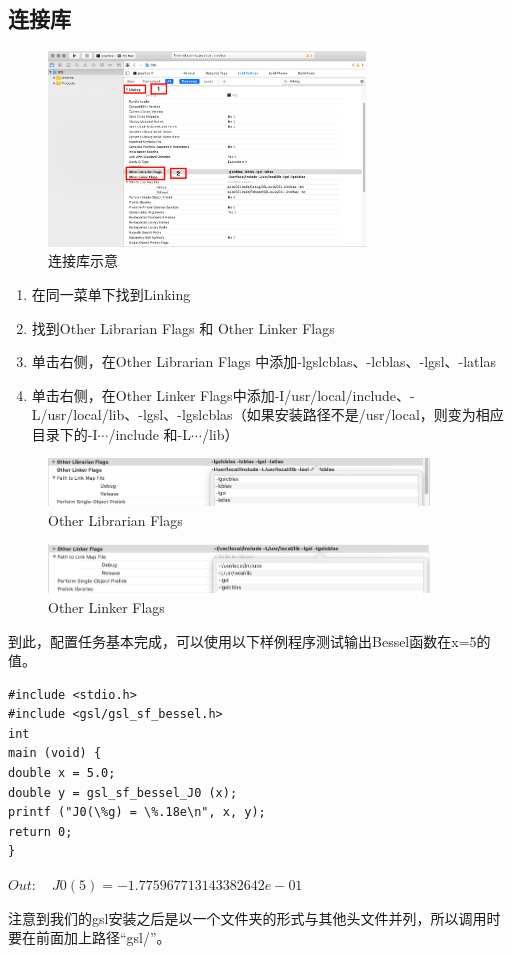 \documentclass[a4paper,11pt,onecolumn,twoside]{article}
\begin{document}
\subsection{连接库}
\begin{figure}[htbp]
  \centering
  \includegraphics[width=0.75\textwidth]{figures/2.png}
  \caption{连接库示意} \label{pngsample}
\end{figure}
\begin{enumerate}
\item 在同一菜单下找到Linking
\item 找到Other Librarian Flags 和 Other Linker Flags
\item 单击右侧，在Other Librarian Flags 中添加-lgslcblas、-lcblas、-lgsl、-latlas
\item 单击右侧，在Other Linker Flags中添加-I/usr/local/include、-L/usr/local/lib、-lgsl、-lgslcblas（如果安装路径不是/usr/local，则变为相应目录下的-I$\cdots$/include 和-L$\cdots$/lib）
\end{enumerate}
\begin{figure}[htbp]
  \centering
  \includegraphics[width=0.9\textwidth]{figures/3.png}
  \caption{Other Librarian Flags} \label{pngsample}
\end{figure}
\begin{figure}[htbp]
  \centering
  \includegraphics[width=0.9\textwidth]{figures/4.png}
  \caption{Other Linker Flags} \label{pngsample}
\end{figure}
到此，配置任务基本完成，可以使用以下样例程序测试输出Bessel函数在x=5的值。
\begin{lstlisting}
#include <stdio.h>
#include <gsl/gsl_sf_bessel.h>
int
main (void) {
double x = 5.0;
double y = gsl_sf_bessel_J0 (x); 
printf ("J0(\%g) = \%.18e\n", x, y); 
return 0;
}
\end{lstlisting}
$Out: \quad J0(5) = -1.775967713143382642e-01$\par
注意到我们的gsl安装之后是以一个文件夹的形式与其他头文件并列，所以调用时要在前面加上路径“gsl/”。
\end{document}
